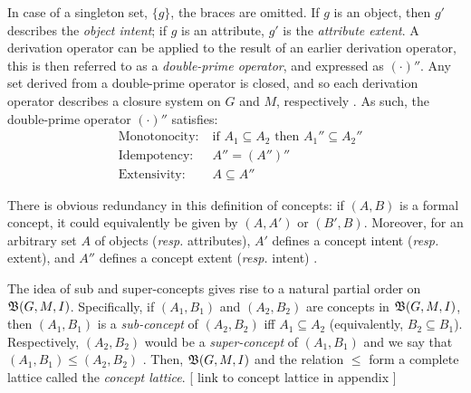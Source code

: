 %
In case of a singleton set, $\{g\}$, the braces are omitted. If $g$ is an object, then $g'$ describes the \emph{object intent}; if $g$ is an attribute, $g'$ is the \emph{attribute extent}. A derivation operator can be applied to the result of an earlier derivation operator, this is then referred to as a \emph{double-prime operator}, and expressed as $(\cdot)''$.
Any set derived from a double-prime operator is closed, and so each derivation operator describes a closure system on $G$ and $M$, respectively \cite{ganter1999formal,ganter2016conceptual,rudolph2007relational}. As such, the double-prime operator $(\cdot)''$ satisfies:
%
\[
    \begin{aligned}
         & \text{Monotonocity:} & \; \text{if } A_1 \subseteq A_2 \text{ then } A_1'' \subseteq A_2'' \\
         & \text{Idempotency:}  & \; A'' = (A'')''                                                    \\
         & \text{Extensivity:}  & \; A \subseteq A''
    \end{aligned}
\]
%
%
There is obvious redundancy in this definition of concepts: if $(A,B)$ is a formal concept, it could equivalently be given by $(A,A')$ or $(B',B)$. Moreover, for an arbitrary set $A$ of objects (\textit{resp.} attributes), $A'$ defines a concept intent (\textit{resp.} extent), and $A''$ defines a concept extent (\textit{resp.} intent) \cite{ganter2016conceptual}.
%
%
The idea of sub and super-concepts gives rise to a natural partial order on $\mathfrak{B}(G,M,I)$. Specifically, if $(A_1,B_1)$ and $(A_2,B_2)$ are concepts in $\mathfrak{B}(G,M,I)$, then $(A_1,B_1)$ is a \emph{sub-concept} of $(A_2,B_2)$ iff $A_1 \subseteq A_2$ (equivalently, $B_2 \subseteq B_1$). Respectively, $(A_2,B_2)$ would be a \emph{super-concept} of $(A_1,B_1)$ and we say that $(A_1,B_1) \leq (A_2,B_2)$ \cite{ganter1999formal}. Then, $\mathfrak{B}(G,M,I)$ and the relation $\leq$ form a complete lattice called the \emph{concept lattice}. [ link to concept lattice in appendix ]

